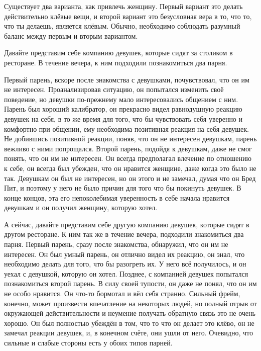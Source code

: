 Существует два варианта, как привлечь женщину. Первый вариант это делать действительно клёвые вещи, и второй вариант это безусловная вера в то, что то, что ты делаешь, является клёвым. Обычно, необходимо соблюдать разумный баланс между первым и вторым вариантом.

Давайте представим себе компанию девушек, которые сидят за столиком в ресторане. В течение вечера, к ним подходили познакомиться два парня.

Первый парень, вскоре после знакомства с девушками, почувствовал, что он им не интересен. Проанализировав ситуацию, он попытался изменить своё поведение, но девушки по-прежнему мало интересовались общением с ним. Парень был хороший калибратор, он прекрасно видел равнодушную реакцию девушек на себя, в то же время для того, что бы чувствовать себя уверенно и комфортно при общении, ему необходима позитивная реакция на себя девушек. Не добившись позитивной реакции, поняв, что он не интересен девушкам, парень вежливо с ними попрощался. Второй парень, подойдя к девушкам, даже не смог понять, что он им не интересен. Он всегда предполагал влечение по отношению к себе, он всегда был убежден, что он нравится женщине, даже когда это было не так. Девушкам он был не интересен, но он этого и не замечал, думая что он Бред Пит, и поэтому у него не было причин для того что бы покинуть девушек. В конце концов, эта его непоколебимая уверенность в себе начала нравится девушкам и он получил женщину, которую хотел.

А сейчас, давайте представим себе другую компанию девушек, которые сидят в другом ресторане. К ним так же в течение вечера, подходили знакомиться два парня. Первый парень, сразу после знакомства, обнаружил, что он им не интересен. Он был умный парень, он отлично видел их реакцию, он знал, что необходимо делать для того, что бы разогреть их. У него всё получилось, и он уехал с девушкой, которую он хотел. Позднее, с компанией девушек попытался познакомиться второй парень. В силу своей тупости, он даже не понял, что он им не особо нравится. Он что-то бормотал и вёл себя странно. Сильный фрейм, конечно, может произвести впечатление на некоторых людей, но полный отрыв от окружающей действительности и неумение получать обратную связь это не очень хорошо. Он был полностью убеждён в том, что то что он делает это клёво, он не замечал реакции девушек, и, в конечном счёте, они ушли от него. Очевидно, что сильные и слабые стороны есть у обоих типов парней.

